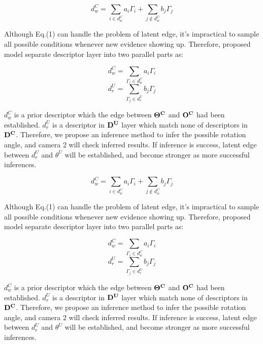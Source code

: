 \documentclass{tADR2e}
\begin{document}
\begin{equation}
d^C_w=\sum_{i\in{d^C_w}}a_{i}\Gamma_{i}+\sum_{j\notin{d^C_w}}b_{j}\Gamma_{j}
\end{equation}

Although Eq.(1) can handle the problem of latent edge, it's impractical to sample all possible conditions whenever new evidence showing up. Therefore, proposed model separate descriptor layer into two parallel parts as: 

\begin{equation}
d^C_w=\sum_{\Gamma_{i}\in{d^C_w}}a_{i}\Gamma_{i}
\end{equation}
\begin{equation}
d^U_r=\sum_{\Gamma_{j}\in{d^U_r}}b_{j}\Gamma_{j}
\end{equation}

$d^C_w$ is a prior descriptor which the edge between $\bf{\Theta^{C}}$ and $\bf{O^C}$ had been established. $d^U_r$ is a descriptor in $\bf{D^U}$ layer which match none of descriptors in $\bf{D^C}$. Therefore, we propose an inference method to infer the possible rotation angle, and camera 2 will check inferred results. If inference is success, latent edge between $d^U_r$ and $\theta^{U}$ will be established, and become stronger as more successful inferences.

\begin{equation}
d^C_w=\sum_{i\in{d^C_w}}a_{i}\Gamma_{i}+\sum_{j\notin{d^C_w}}b_{j}\Gamma_{j}
\end{equation}

Although Eq.(1) can handle the problem of latent edge, it's impractical to sample all possible conditions whenever new evidence showing up. Therefore, proposed model separate descriptor layer into two parallel parts as: 

\begin{equation}
d^C_w=\sum_{\Gamma_{i}\in{d^C_w}}a_{i}\Gamma_{i}
\end{equation}
\begin{equation}
d^U_r=\sum_{\Gamma_{j}\in{d^U_r}}b_{j}\Gamma_{j}
\end{equation}

$d^C_w$ is a prior descriptor which the edge between $\bf{\Theta^{C}}$ and $\bf{O^C}$ had been established. $d^U_r$ is a descriptor in $\bf{D^U}$ layer which match none of descriptors in $\bf{D^C}$. Therefore, we propose an inference method to infer the possible rotation angle, and camera 2 will check inferred results. If inference is success, latent edge between $d^U_r$ and $\theta^{U}$ will be established, and become stronger as more successful inferences.
\end{document}
